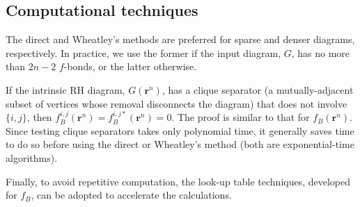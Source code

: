 \documentclass[aip,jcp,preprint,superscriptaddress,showpacs,preprintnumbers,amsmath,amssymb]{revtex4-1}
\numberwithin{equation}{section}
\newcommand{\vct}[1]{\mathbf{#1}}
\providecommand{\vr}{} %
\renewcommand{\vr}{\vct{r}}
\begin{document}
\subsection{Computational techniques}




The direct and Wheatley's methods
are preferred for sparse and denser diagrams,
respectively.
%
In practice,
we use the former if the input diagram, $G$,
has no more than $2n-2$ $f$-bonds,
or the latter otherwise.



If the intrinsic RH diagram, $G(\vr^n)$,
has a clique separator
(a mutually-adjacent subset of vertices
whose removal disconnects the diagram)
that does not involve $\{i, j\}$,
then $f_B^{i,j}(\vr^n) = f_B^{i,j*}(\vr^n) = 0$.
%
The proof is similar to that for $f_B(\vr^n)$\cite{zhang2014}.
%
Since testing clique separators takes only polynomial time,
it generally saves time to do so
before using the direct or Wheatley's method
(both are exponential-time algorithms).



Finally, to avoid repetitive computation,
the look-up table techniques\cite{
zhang2014, ree1964a, clisby2006,
ree1967, *labik2005, *schultz2014},
developed for $f_B$,
can be adopted to accelerate the calculations.






\end{document}
